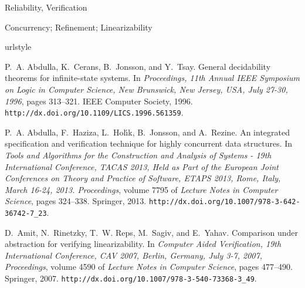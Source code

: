 \documentclass[9pt,natbib,authoryear]{sigplanconf}
\begin{document}

\terms
Reliability, Verification

\keywords
Concurrency; Refinement; Linearizability













\appendix






% 

\begin{thebibliography}{26}
\providecommand{\natexlab}[1]{#1}
\providecommand{\url}[1]{\texttt{#1}}
\expandafter\ifx\csname urlstyle\endcsname\relax
  \providecommand{\doi}[1]{doi: #1}\else
  \providecommand{\doi}{doi: \begingroup \urlstyle{rm}\Url}\fi

P.~A. Abdulla, K.~Cerans, B.~Jonsson, and Y.~Tsay.
\newblock General decidability theorems for infinite-state systems.
\newblock In \emph{Proceedings, 11th Annual {IEEE} Symposium on Logic in
  Computer Science, New Brunswick, New Jersey, USA, July 27-30, 1996}, pages
  313--321. {IEEE} Computer Society, 1996.
\newblock \url{http://dx.doi.org/10.1109/LICS.1996.561359}.

P.~A. Abdulla, F.~Haziza, L.~Hol{\'{\i}}k, B.~Jonsson, and A.~Rezine.
\newblock An integrated specification and verification technique for highly
  concurrent data structures.
\newblock In \emph{Tools and Algorithms for the Construction and Analysis of
  Systems - 19th International Conference, {TACAS} 2013, Held as Part of the
  European Joint Conferences on Theory and Practice of Software, {ETAPS} 2013,
  Rome, Italy, March 16-24, 2013. Proceedings}, volume 7795 of \emph{Lecture
  Notes in Computer Science}, pages 324--338. Springer, 2013.
\newblock \url{http://dx.doi.org/10.1007/978-3-642-36742-7_23}.

D.~Amit, N.~Rinetzky, T.~W. Reps, M.~Sagiv, and E.~Yahav.
\newblock Comparison under abstraction for verifying linearizability.
\newblock In \emph{Computer Aided Verification, 19th International Conference,
  {CAV} 2007, Berlin, Germany, July 3-7, 2007, Proceedings}, volume 4590 of
  \emph{Lecture Notes in Computer Science}, pages 477--490. Springer, 2007.
\newblock \url{http://dx.doi.org/10.1007/978-3-540-73368-3_49}.


\end{thebibliography}
\end{document}
